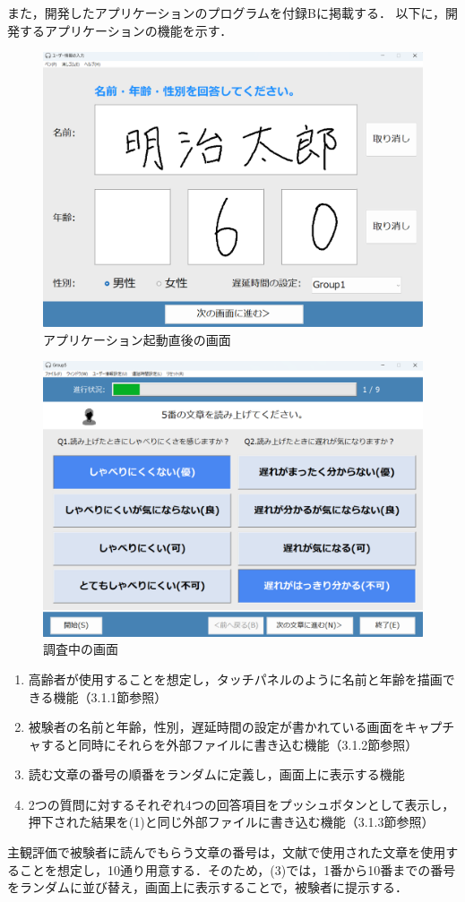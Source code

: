また，開発したアプリケーションのプログラムを付録Bに掲載する．
以下に，開発するアプリケーションの機能を示す．
\begin{figure}[tbp]
  \centering
  \includegraphics[scale=0.25]{figures/Syukann/gamen_1.png}
  \caption{アプリケーション起動直後の画面}
  \label{fig:1_userInterface}
\end{figure}
\begin{figure}[tbp]
  \centering
  \includegraphics[scale=0.25]{figures/Syukann/app_2.png}
  \caption{調査中の画面}
  \label{fig:2_userInterface}
\end{figure}
\begin{enumerate}[leftmargin=*]
  \item 高齢者が使用することを想定し，タッチパネルのように名前と年齢を描画できる機能（3.1.1節参照）
  \item 被験者の名前と年齢，性別，遅延時間の設定が書かれている画面をキャプチャすると同時にそれらを外部ファイルに書き込む機能（3.1.2節参照）
  \item 読む文章の番号の順番をランダムに定義し，画面上に表示する機能
  \item 2つの質問に対するそれぞれ4つの回答項目をプッシュボタンとして表示し，押下された結果を(1)と同じ外部ファイルに書き込む機能（3.1.3節参照）
\end{enumerate}
主観評価で被験者に読んでもらう文章の番号は，文献\cite{kayama}で使用された文章を使用することを想定し，10通り用意する．そのため，(3)では，1番から10番までの番号をランダムに並び替え，画面上に表示することで，被験者に提示する．
